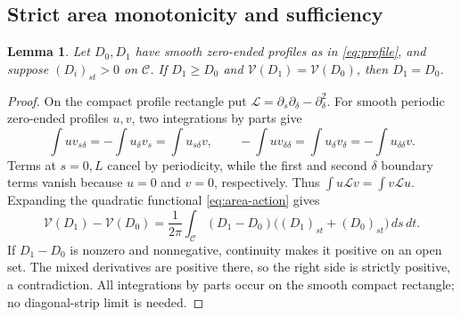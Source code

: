 \documentclass[11pt]{article}
\newtheorem{lemma}[theorem]{Lemma}
\theoremstyle{remark}
\newcommand{\Cpair}{\mathcal C}
\newcommand{\Varea}{\mathcal V}
\newcommand{\dd}{\,d}
\begin{document}
\subsection{Strict area monotonicity and sufficiency}
\begin{lemma}\label{lem:area-order}
Let $D_0,D_1$ have smooth zero-ended profiles as in
\eqref{eq:profile}, and suppose $(D_i)_{st}>0$ on $\Cpair$.
If $D_1\ge D_0$ and $\Varea(D_1)=\Varea(D_0)$, then $D_1=D_0$.
\end{lemma}
\begin{proof}
On the compact profile rectangle put
$\mathcal L=\partial_s\partial_\delta-\partial_\delta^2$.
For smooth periodic zero-ended profiles $u,v$, two integrations by parts
give
\[
 \int u v_{s\delta}=-\int u_\delta v_s=\int u_{s\delta}v,
 \qquad
 -\int u v_{\delta\delta}=\int u_\delta v_\delta
                           =-\int u_{\delta\delta}v.
\]
Terms at $s=0,L$ cancel by periodicity, while the first and second
$\delta$ boundary terms vanish because $u=0$ and $v=0$, respectively.
Thus $\int u\mathcal Lv=\int v\mathcal Lu$. Expanding the quadratic
functional \eqref{eq:area-action} gives
\begin{equation}\label{eq:area-difference}
 \Varea(D_1)-\Varea(D_0)
 =\frac1{2\pi}\int_{\Cpair}(D_1-D_0)
             \big((D_1)_{st}+(D_0)_{st}\big)\dd s\dd t.
\end{equation}
If $D_1-D_0$ is nonzero and nonnegative, continuity makes it positive
on an open set. The mixed derivatives are positive there, so the right
side is strictly positive, a contradiction. All integrations by parts
occur on the smooth compact rectangle; no diagonal-strip limit is needed.
\end{proof}
\end{document}
